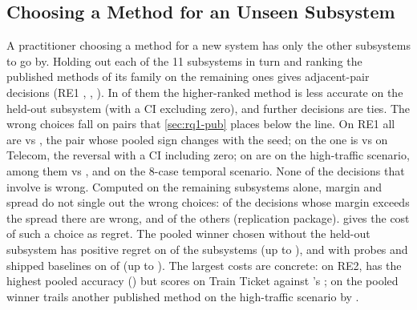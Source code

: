 \subsection{Choosing a Method for an Unseen Subsystem}
\label{sec:rq1-heldout}

A practitioner choosing a method for a new system has only the other subsystems to go by.
Holding out each of the 11 subsystems in turn and ranking the published methods of its family on the remaining ones gives \HNDec adjacent-pair decisions (RE1 \HDecReOne, \openrca \HDecOpenrca, \petshop \HDecPetshop).
In \HErr of them the higher-ranked method is less accurate on the held-out subsystem (\HStrict with a CI excluding zero), and \HTies further decisions are ties.
The \HErr wrong choices fall on pairs that \cref{sec:rq1-pub} places below the line.
On RE1 all \HErrReOne are \rcd vs \causalrca, the pair whose pooled sign changes with the seed; on \openrca the one is \baro vs \rcd on Telecom, the reversal with a CI including zero; on \petshop \HErrPetshopHigh are on the high-traffic scenario, among them \rcd vs \baro, and \HErrPetshopTmpOne on the 8-case temporal scenario.
None of the \HEdiagDec decisions that involve \ediag is wrong.
Computed on the remaining subsystems alone, margin and spread do not single out the wrong choices: \HRecErr of the \HRec decisions whose margin exceeds the spread there are wrong, and \HFlagErr of the \HFlag others (replication package).
 gives the cost of such a choice as regret.
The pooled winner chosen without the held-out subsystem has positive regret on \LosoRegPubN of the \LosoRegPubOf subsystems (up to \LosoRegPubMax), and with probes and shipped baselines on \LosoRegAllN of \LosoRegAllOf (up to \LosoRegAllMax).
The largest costs are concrete: on RE2, \circa has the highest pooled accuracy (\RegReTwoWinnerPooled) but scores \RegReTwoTTwinner on Train Ticket against \simplerca's \RegReTwoTTbest; on \petshop the pooled winner \circa trails another published method on the high-traffic scenario by \RegPetshopHigh.

\begin{table}[t]
\caption{Pooled winner (subsystems weighted equally) and its regret: accuracy of the best method on a subsystem minus the winner's accuracy there. All subsystems: winner chosen on all subsystems of the family. Held out: for each subsystem, winner chosen on the other subsystems only (not computed for RE2, which we use only across releases).}
\label{tab:regret}
\footnotesize

\end{table}

